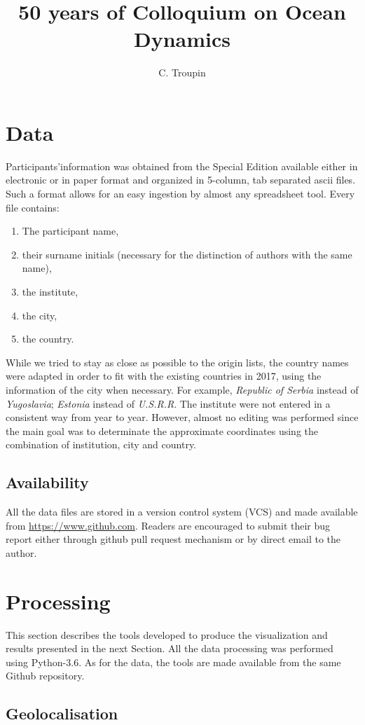 \documentclass[12pt,a4paper,oneside,final]{article}
\author{C. Troupin}
\title{50 years of Colloquium on Ocean Dynamics}
\begin{document}
\section{Data}

Participants'information was obtained from the Special Edition available either in electronic or in paper format and organized in 5-column, tab separated ascii files. Such a format allows for an easy ingestion by almost any spreadsheet tool. Every file contains: 
\begin{enumerate}
\item The participant name,
\item their surname initials (necessary for the distinction of authors with the same name),
\item the institute,
\item the city,
\item the country.
\end{enumerate}
While we tried to stay as close as possible to the origin lists, the country names were adapted in order to fit with the existing countries in 2017, using the information of the city when necessary. For example, \textit{Republic of Serbia} instead of \textit{Yugoslavia}; \textit{Estonia} instead of \textit{U.S.R.R}.
The institute were not entered in a consistent way from year to year. However, almost no editing was performed since the main goal was to determinate the approximate coordinates using the combination of institution, city and country. 

\subsection{Availability}

All the data files are stored in a version control system (VCS) and made available from \url{https://www.github.com}. Readers are encouraged to submit their bug report either through github pull request mechanism or by direct email to the author. 

\section{Processing}

This section describes the tools developed to produce the visualization and results presented in the next Section. 
All the data processing was performed using Python-3.6. As for the data, the tools are made available from the same Github repository.

\subsection{Geolocalisation}
\end{document}
